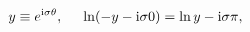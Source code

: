 \begin{equation}
y \equiv e^{ {\rm i} \sigma \theta}, \hspace{5mm}
\ln(-y-{\rm i}\sigma 0) = \ln{y} - {\rm i} \sigma \pi,
\end{equation}

